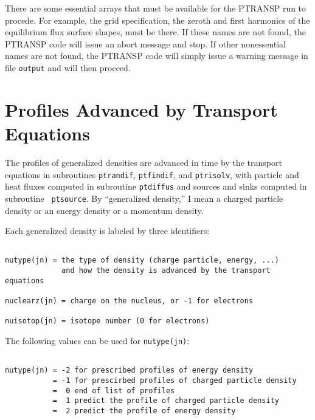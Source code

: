 There are some essential arrays that must be available for the PTRANSP
run to procede.  For example, the grid specification, the zeroth and
first harmonics of the equilibrium flux surface shapes, must be there. 
If these names are not found, the PTRANSP code will issue an abort
message and stop.  If other nonessential names are not found, the
PTRANSP code will simply issue a warning message in file {\tt output}
and will then proceed.


\section{Profiles Advanced by Transport Equations}

The profiles of generalized densities are advanced in time by the
transport equations in subroutines {\tt ptrandif}, {\tt ptfindif}, and
{\tt ptrisolv}, with particle and heat fluxes computed in subroutine
{\tt ptdiffus} and sources and sinks computed in subroutine {\tt
ptsource}.
By ``generalized density,'' I mean a charged particle density or an
energy density or a momentum density.

Each generalized density is labeled by three identifiers:
\begin{verbatim}

nutype(jn) = the type of density (charge particle, energy, ...)
             and how the density is advanced by the transport equations
             
nuclearz(jn) = charge on the nucleus, or -1 for electrons

nuisotop(jn) = isotope number (0 for electrons)

\end{verbatim}

The following values can be used for {\tt nutype(jn)}:
\begin{verbatim}

nutype(jn) = -2 for prescribed profiles of energy density
           = -1 for prescirbed profiles of charged particle density
           =  0 end of list of profiles
           =  1 predict the profile of charged particle density
           =  2 predict the profile of energy density

\end{verbatim}

